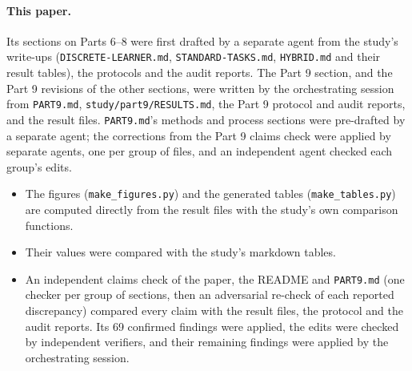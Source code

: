 \begin{itemize}
\end{itemize}

\paragraph{This paper.} Its sections on Parts 6--8 were first drafted by a separate agent from the study's write-ups (\texttt{DISCRETE-LEARNER.md}, \texttt{STANDARD-TASKS.md}, \texttt{HYBRID.md} and their result tables), the protocols and the audit reports. The Part 9 section, and the Part 9 revisions of the other sections, were written by the orchestrating session from \texttt{PART9.md}, \texttt{study/part9/RESULTS.md}, the Part 9 protocol and audit reports, and the result files. \texttt{PART9.md}'s methods and process sections were pre-drafted by a separate agent; the corrections from the Part 9 claims check were applied by separate agents, one per group of files, and an independent agent checked each group's edits.
\begin{itemize}
\item The figures (\texttt{make\_figures.py}) and the generated tables (\texttt{make\_tables.py}) are computed directly from the result files with the study's own comparison functions.
\item Their values were compared with the study's markdown tables.
\item An independent claims check of the paper, the README and \texttt{PART9.md} (one checker per group of sections, then an adversarial re-check of each reported discrepancy) compared every claim with the result files, the protocol and the audit reports. Its 69 confirmed findings were applied, the edits were checked by independent verifiers, and their remaining findings were applied by the orchestrating session.
\end{itemize}

